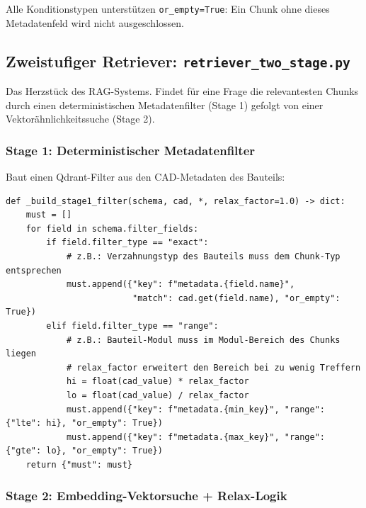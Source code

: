 \documentclass[12pt, a4paper]{article}
\begin{document}
Alle Konditionstypen unterstützen \texttt{or\_empty=True}: Ein Chunk ohne dieses
Metadatenfeld wird nicht ausgeschlossen.

\subsection{Zweistufiger Retriever: \texttt{retriever\_two\_stage.py}}

Das Herzstück des RAG-Systems. Findet für eine Frage die relevantesten Chunks
durch einen deterministischen Metadatenfilter (Stage 1) gefolgt von einer
Vektorähnlichkeitssuche (Stage 2).

\subsubsection{Stage 1: Deterministischer Metadatenfilter}

Baut einen Qdrant-Filter aus den CAD-Metadaten des Bauteils:

\begin{lstlisting}[style=pythonstyle, caption={Stage-1-Filter-Aufbau}]
def _build_stage1_filter(schema, cad, *, relax_factor=1.0) -> dict:
    must = []
    for field in schema.filter_fields:
        if field.filter_type == "exact":
            # z.B.: Verzahnungstyp des Bauteils muss dem Chunk-Typ entsprechen
            must.append({"key": f"metadata.{field.name}",
                         "match": cad.get(field.name), "or_empty": True})
        elif field.filter_type == "range":
            # z.B.: Bauteil-Modul muss im Modul-Bereich des Chunks liegen
            # relax_factor erweitert den Bereich bei zu wenig Treffern
            hi = float(cad_value) * relax_factor
            lo = float(cad_value) / relax_factor
            must.append({"key": f"metadata.{min_key}", "range": {"lte": hi}, "or_empty": True})
            must.append({"key": f"metadata.{max_key}", "range": {"gte": lo}, "or_empty": True})
    return {"must": must}
\end{lstlisting}

\subsubsection{Stage 2: Embedding-Vektorsuche + Relax-Logik}
\end{document}
